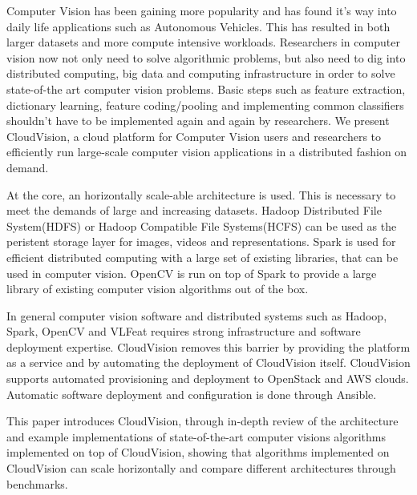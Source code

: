 \begin{eabstract}
    Computer Vision has been gaining more popularity and has found it's way into daily
    life applications such as Autonomous Vehicles. This has resulted in both larger
    datasets and more compute intensive workloads. Researchers in computer vision now
    not only need to solve algorithmic problems, but also need to dig into distributed
    computing, big data and computing infrastructure in order to solve state-of-the art
    computer vision problems. Basic steps such as feature extraction, dictionary learning,
    feature coding/pooling and implementing common classifiers shouldn't have to be
    implemented again and again by researchers. We present CloudVision, a cloud platform
    for Computer Vision users and researchers to efficiently run large-scale computer
    vision applications in a distributed fashion on demand.

    At the core, an horizontally scale-able architecture is used. This is necessary to
    meet the demands of large and increasing datasets. Hadoop Distributed File System(HDFS)
    or Hadoop Compatible File Systems(HCFS) can be used as the peristent storage layer for images, videos
    and representations. Spark is used for efficient distributed computing
    with a large set of existing libraries, that can be used in computer vision. OpenCV is
    run on top of Spark to provide a large library of existing computer vision algorithms
    out of the box.

    In general computer vision software and distributed systems such as Hadoop, Spark, OpenCV and VLFeat requires strong
    infrastructure and software deployment expertise. CloudVision removes this barrier by
    providing the platform as a service and by automating the deployment of CloudVision
    itself. CloudVision supports automated provisioning and deployment to OpenStack and AWS
    clouds. Automatic software deployment and configuration is done through Ansible.

    This paper introduces CloudVision, through in-depth review of the architecture and
    example implementations of state-of-the-art computer visions algorithms implemented
    on top of CloudVision, showing that algorithms implemented on CloudVision can scale horizontally
    and compare different architectures through benchmarks.

\end{eabstract}

